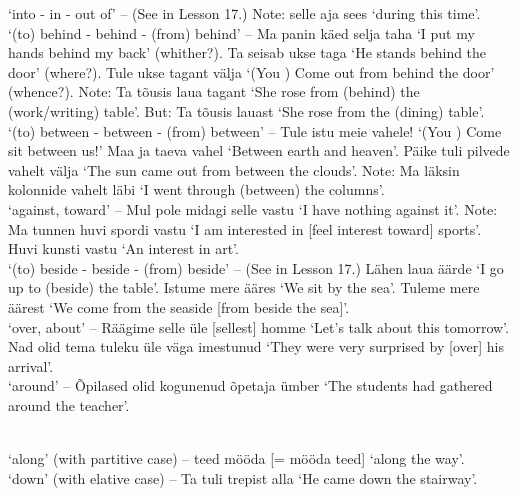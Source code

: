  `into - in - out of' -- (See  in Lesson 17.) Note: selle aja sees `during this time'. \\

 `(to) behind - behind - (from) behind' -- Ma panin käed selja taha `I put my hands behind my back' (whither?). Ta seisab ukse taga `He stands behind the door' (where?). Tule ukse tagant välja `(You \sing) Come out from behind the door' (whence?). Note: Ta tõusis laua tagant `She rose from (behind) the (work/writing) table'. But: Ta tõusis lauast `She rose from the (dining) table'. \\

 `(to) between - between - (from) between' -- Tule istu meie vahele! `(You \sing) Come sit between us!' Maa ja taeva vahel `Between earth and heaven'. Päike tuli pilvede vahelt välja `The sun came out from between the clouds'. Note: Ma läksin kolonnide vahelt läbi `I went through (between) the columns'. \\

 `against, toward' -- Mul pole midagi selle vastu `I have nothing against it'. Note: Ma tunnen huvi spordi vastu `I am interested in [feel interest toward] sports'. Huvi kunsti vastu `An interest in art'. \\

 `(to) beside - beside - (from) beside' -- (See  in Lesson 17.) Lähen laua äärde `I go up to (beside) the table'. Istume mere ääres `We sit by the sea'. Tuleme mere äärest `We come from the seaside [from beside the sea]'. \\

 `over, about' -- Räägime selle üle [sellest] homme `Let's talk about this tomorrow'. Nad olid tema tuleku üle väga imestunud `They were very surprised by [over] his arrival'. \\

 `around' -- Õpilased olid kogunenud õpetaja ümber `The students had gathered around the teacher'.

\newSection {} \\

 `along' (with partitive case) -- teed mööda [= mööda teed] `along the way'. \\

 `down' (with elative case) -- Ta tuli trepist alla `He came down the stairway'. \\

